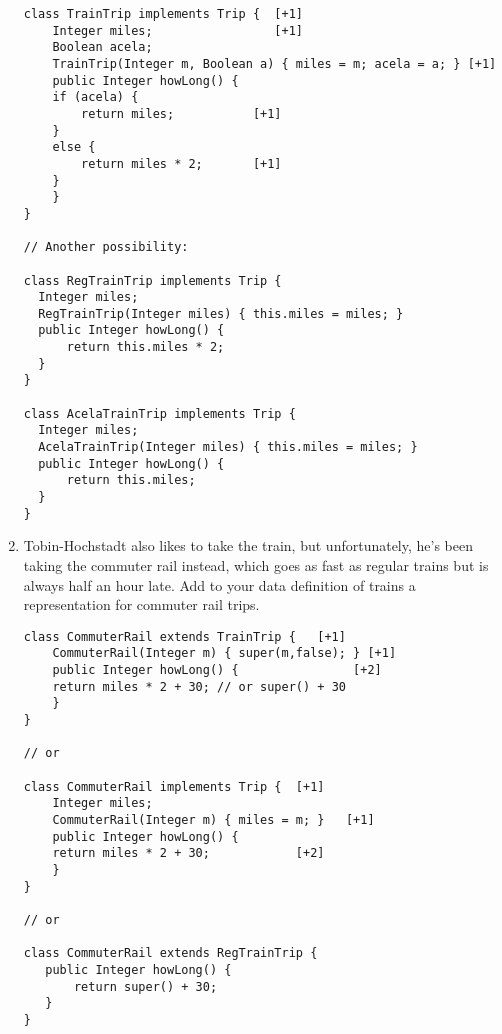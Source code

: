 \documentclass[12pt]{article}                   %
\newenvironment{solution}{}{}
\begin{document}
\begin{problem}
\begin{enumerate}
\begin{solution}
\begin{verbatim}
class TrainTrip implements Trip {  [+1]
    Integer miles;                 [+1]
    Boolean acela;
    TrainTrip(Integer m, Boolean a) { miles = m; acela = a; } [+1]
    public Integer howLong() { 
	if (acela) {
	    return miles;           [+1]
	}
	else {
	    return miles * 2;       [+1]
	}
    }
}

// Another possibility:

class RegTrainTrip implements Trip {
  Integer miles;
  RegTrainTrip(Integer miles) { this.miles = miles; }
  public Integer howLong() {
      return this.miles * 2;
  }
}

class AcelaTrainTrip implements Trip {
  Integer miles;  
  AcelaTrainTrip(Integer miles) { this.miles = miles; }
  public Integer howLong() {
      return this.miles;
  }
}
\end{verbatim}
\end{solution}

\newpage
\item Tobin-Hochstadt also likes to take the train, but unfortunately,
  he's been taking the commuter rail instead, which goes as fast as
  regular trains but is always half an hour late.  Add to your data
  definition of trains a representation for commuter rail trips.  

\begin{solution}
\begin{verbatim}
class CommuterRail extends TrainTrip {   [+1]
    CommuterRail(Integer m) { super(m,false); } [+1]
    public Integer howLong() {                [+2]
	return miles * 2 + 30; // or super() + 30
    }
}

// or 

class CommuterRail implements Trip {  [+1]
    Integer miles;
    CommuterRail(Integer m) { miles = m; }   [+1]
    public Integer howLong() { 
	return miles * 2 + 30;            [+2]
    }
}

// or

class CommuterRail extends RegTrainTrip {
   public Integer howLong() {
       return super() + 30;
   }
}
\end{verbatim}
\end{solution}

\end{enumerate}

\newpage
\ifrubric{}
\newpage
\fi
\end{problem}
\newpage
\end{document}
